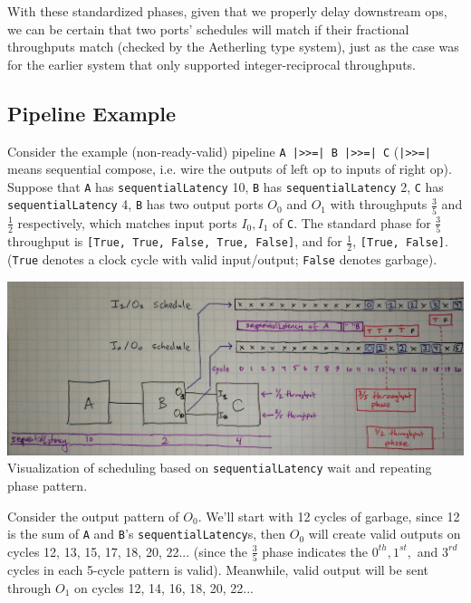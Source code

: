 \documentclass[12pt]{article}
\begin{document}
With these standardized phases, given that we properly delay
downstream ops, we can be certain that two ports' schedules will match
if their fractional throughputs match (checked by the Aetherling type
system), just as the case was for the earlier system that only
supported integer-reciprocal throughputs.

\subsection{Pipeline Example}

Consider the example (non-ready-valid) pipeline \texttt{A |>>=| B |>>=| C}
(\texttt{|>>=|} means sequential compose, i.e. wire the outputs of
left op to inputs of right op). Suppose that \texttt{A} has
\texttt{sequentialLatency} 10, \texttt{B} has \texttt{sequentialLatency}
2, \texttt{C} has \texttt{sequentialLatency} 4, \texttt{B} has two output
ports $O_0$ and $O_1$ with throughputs $\frac{3}{5}$ and $\frac{1}{2}$
respectively, which matches input ports $I_0, I_1$ of \texttt{C}.
The standard phase for $\frac{3}{5}$ throughput is
\texttt{[True, True, False, True, False]},
and for $\frac{1}{2}$, \texttt{[True, False]}. (\texttt{True} denotes
a clock cycle with valid input/output; \texttt{False} denotes garbage).

\newpage
\begin{center}
\includegraphics[width=1.0\linewidth]{Figures/phase.jpg}
Visualization of scheduling based on \texttt{sequentialLatency}
wait and repeating phase pattern.
\end{center}

Consider the output pattern of $O_0$. We'll start with 12 cycles of
garbage, since 12 is the sum of \texttt{A} and \texttt{B}'s
\texttt{sequentialLatency}s, then $O_0$ will create valid outputs on
cycles 12, 13, 15, 17, 18, 20, 22... (since the $\frac{3}{5}$ phase
indicates the $0^{th}, 1^{st},$ and $3^{rd}$ cycles in each 5-cycle
pattern is valid). Meanwhile, valid output will be sent through $O_1$
on cycles 12, 14, 16, 18, 20, 22...
\end{document}
